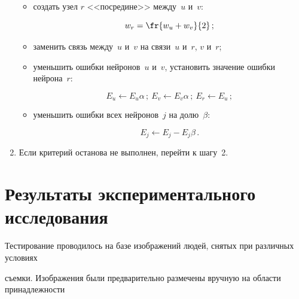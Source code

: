 \begin{multicols}{2}
\begin{enumerate}
\begin{itemize}
\item создать узел $r$ <<посредине>> между~$u$ и~$v$:

$$

w_r =\fr{w_u+w_v}{2}\,;

$$

\item заменить связь между~$u$ и~$v$ на связи~$u$ и~$r$, $v$ и~$r$;\\[-14pt]

\item уменьшить ошибки нейронов~$u$ и~$v$, установить значение ошибки нейрона~$r$:



\noindent

$$

E_u\leftarrow E_u\alpha\,;\ E_v \leftarrow E_v\alpha\,;\ E_r\leftarrow E_u\,;$$

\item уменьшить ошибки всех нейронов~$j$ на долю~$\beta$:



\noindent

$$

E_j\leftarrow E_j-E_j\beta\,.

$$

      \end{itemize}

\item Если критерий останова не выполнен, перейти к шагу~2.\\[-13pt]

\end{enumerate}



\vspace*{-9pt}



\section{Результаты экспериментального исследования}



      Тестирование проводилось на базе изображений людей, снятых при различных условиях

      съемки. Изображения были предварительно размечены вручную на области принадлежности\linebreak\vspace*{-12pt}

      

      \pagebreak


\end{multicols}

